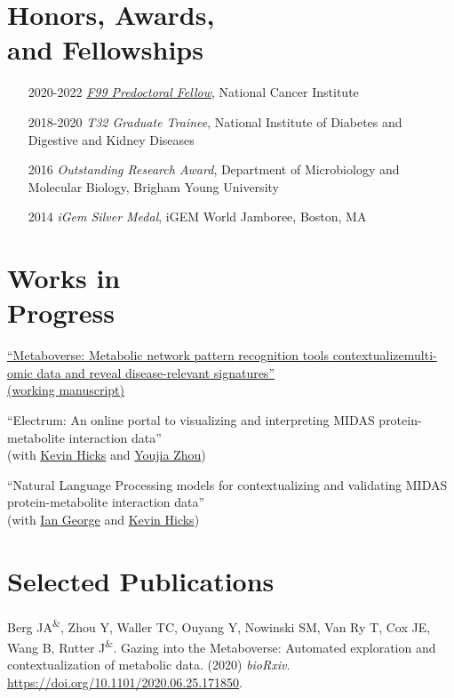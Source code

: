 \documentclass[margin,line]{res}
\begin{document}
\begin{resume}
\section{\sc Honors, Awards, \\and Fellowships}
\begin{itemize}[style=multiline,leftmargin=2.2cm,font=\normalfont]
\item[2020-2022] \textit{\href{https://github.com/j-berg/NCI_F99_application/blob/main/Berg-Jordan_NCI-F99_2019-application_Redacted.pdf}{F99 Predoctoral Fellow}}, National Cancer Institute
\item[2018-2020] \textit{T32 Graduate Trainee}, National Institute of Diabetes and Digestive and Kidney Diseases
\item[2016] \textit{Outstanding Research Award}, Department of Microbiology and Molecular Biology, Brigham Young University
\item[2014] \textit{iGem Silver Medal}, iGEM World Jamboree, Boston, MA
\end{itemize}


\section{\sc Works in \\Progress}
\href{https://metaboverse.readthedocs.io/en/latest/}{``Metaboverse: Metabolic network pattern recognition tools contextualizemulti-omic data and reveal disease-relevant signatures''} \\
\href{https://www.overleaf.com/project/5f831698b9237b0001a5ae60}{(working manuscript)}

``Electrum: An online portal to visualizing and interpreting MIDAS protein-metabolite interaction data'' \\
(with \href{https://github.com/KGHicks}{Kevin Hicks} and \href{https://github.com/zhou325}{Youjia Zhou})

``Natural Language Processing models for contextualizing and validating MIDAS protein-metabolite interaction data'' \\
(with \href{https://github.com/ig-ghub}{Ian George} and \href{https://github.com/KGHicks}{Kevin Hicks})


\section{\sc Selected Publications}
Berg JA\textsuperscript{\&}, Zhou Y, Waller TC, Ouyang Y, Nowinski SM, Van Ry T, Cox JE, Wang B, Rutter J\textsuperscript{\&}. Gazing into the Metaboverse: Automated exploration and contextualization of metabolic data. (2020) \textit{bioRxiv}. \href{https://www.biorxiv.org/content/10.1101/2020.06.25.171850v1}{https://doi.org/10.1101/2020.06.25.171850}.


\end{resume}
\end{document}
